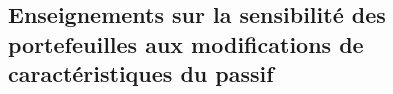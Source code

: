     \subsection{Enseignements sur la sensibilité des portefeuilles aux modifications de caractéristiques du passif}








